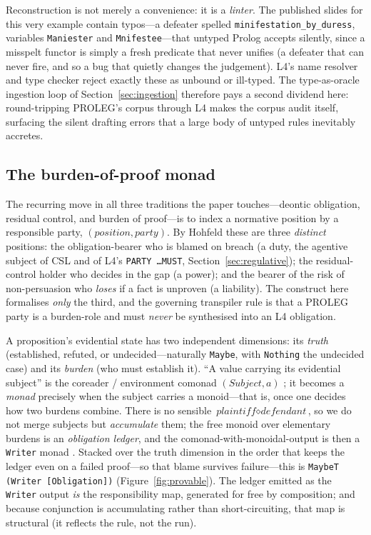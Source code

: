 \documentclass[sigconf,nonacm]{acmart}
\newcommand{\code}[1]{\texttt{\small #1}}
\begin{document}
Reconstruction is not merely a convenience: it is a \emph{linter}. The
published slides for this very example contain typos---a defeater spelled
\code{minifestation\_by\_duress}, variables \code{Maniester} and
\code{Mnifestee}---that untyped Prolog accepts silently, since a misspelt
functor is simply a fresh predicate that never unifies (a defeater that can
never fire, and so a bug that quietly changes the judgement). L4's name
resolver and type checker reject exactly these as unbound or ill-typed. The
type-as-oracle ingestion loop of Section~\ref{sec:ingestion} therefore pays a
second dividend here: round-tripping PROLEG's corpus through L4 makes the
corpus audit itself, surfacing the silent drafting errors that a large body
of untyped rules inevitably accretes.

\subsection{The burden-of-proof monad}\label{app:burden}
The recurring move in all three traditions the paper touches---deontic
obligation, residual control, and burden of proof---is to index a normative
position by a responsible party, $(\textit{position},\textit{party})$. By
Hohfeld \cite{hohfeld1913} these are three \emph{distinct} positions: the
obligation-bearer who is blamed on breach (a duty, the agentive subject of
CSL and of L4's \code{PARTY \ldots MUST}, Section~\ref{sec:regulative}); the
residual-control holder who decides in the gap (a power); and the bearer of
the risk of non-persuasion who \emph{loses} if a fact is unproven (a
liability). The construct here formalises \emph{only} the third, and the
governing transpiler rule is that a PROLEG party is a burden-role and must
\emph{never} be synthesised into an L4 obligation.

A proposition's evidential state has two independent dimensions: its
\emph{truth} (established, refuted, or undecided---naturally \code{Maybe},
with \code{Nothing} the undecided case) and its \emph{burden} (who must
establish it). ``A value carrying its evidential subject'' is the coreader /
environment comonad $(\textit{Subject}, a)$ \cite{uustalu2008comonadic}; it
becomes a \emph{monad} precisely when the subject carries a monoid---that is,
once one decides how two burdens combine. There is no sensible
$\textit{plaintiff} \mathbin{\diamond} \textit{defendant}$, so we do not
merge subjects but \emph{accumulate} them; the free monoid over elementary
burdens is an \emph{obligation ledger}, and the comonad-with-monoidal-output
is then a \code{Writer} monad \cite{wadler1992essence}. Stacked over the
truth dimension in the order that keeps the ledger even on a failed
proof---so that blame survives failure---this is
\code{MaybeT (Writer [Obligation])} (Figure~\ref{fig:provable}). The ledger
emitted as the \code{Writer} output \emph{is} the responsibility map,
generated for free by composition; and because conjunction is accumulating
rather than short-circuiting, that map is structural (it reflects the rule,
not the run).
\end{document}
